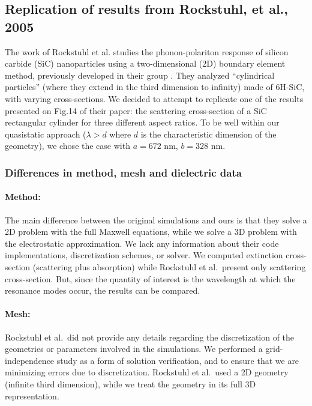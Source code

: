 \subsection{Replication of results from Rockstuhl, et al., 2005}\label{sec:replication1}

The work of Rockstuhl et al.\cite{rockstuhl2005} studies the phonon-polariton response of silicon carbide (SiC)
nanoparticles using a two-dimensional (2D) boundary element method, 
previously developed in their group \cite{rockstuhl2003}. 
They analyzed ``cylindrical particles'' (where they extend in the third dimension to infinity) made of 6H-SiC, with varying cross-sections.
We decided to attempt to replicate one of the results presented on Fig.14 of their paper:
the scattering cross-section of a SiC rectangular cylinder for three different aspect ratios. 
To be well within our quasistatic approach ($\lambda > d$ where $d$ is the characteristic
dimension of the geometry), we chose the case with $a=672$ nm, $b=328$ nm.

\subsubsection{Differences in method, mesh and dielectric data}

\paragraph{Method:} The main difference between the original simulations and ours is that they solve a 2D problem with the 
full Maxwell equations, while we solve a 3D problem with the electrostatic approximation. 
We lack any information about their code implementations, discretization schemes, or solver.  
We computed extinction cross-section (scattering plus absorption) while Rockstuhl et al.\ present only scattering cross-section. 
But, since the quantity of interest is the wavelength at which the resonance modes occur, the results can be compared.

\paragraph{Mesh:} Rockstuhl et al.\ did not provide any details regarding the discretization of the geometries or 
parameters involved in the simulations.
We performed a grid-independence study as a form of solution verification, and to ensure that we are 
minimizing errors due to discretization. Rockstuhl et al.\ used a 2D geometry (infinite third dimension), while we treat the geometry in its full 3D representation.

